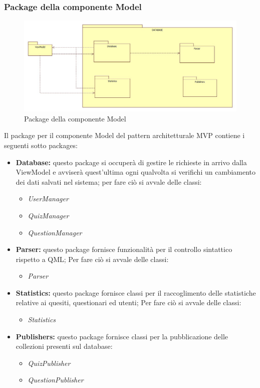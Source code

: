 \subsubsection{Package della componente Model}
	\begin{figure}[h!]
	\begin{center}
		\includegraphics[scale=0.45]{../images/ModelPackage.jpg}
		\caption{Package della componente Model}
	\end{center}
	\end{figure}
	Il package per il componente Model del pattern architetturale MVP contiene i seguenti sotto packages:
	\begin{itemize}
		\item\textbf{Database:} questo package si occuperà di gestire le richieste in arrivo dalla ViewModel e avviserà quest'ultima ogni qualvolta si verifichi un cambiamento dei dati salvati nel sistema; per fare ciò si avvale delle classi:
			\begin{itemize}
				\item\textit{UserManager}
				\item\textit{QuizManager}
				\item\textit{QuestionManager}
			\end{itemize}
		\item\textbf{Parser:} questo package fornisce funzionalità per il controllo sintattico rispetto a QML; Per fare ciò si avvale delle classi:
			\begin{itemize}
				\item\textit{Parser}
			\end{itemize}
		\item\textbf{Statistics:} questo package fornisce classi per il raccoglimento delle statistiche relative ai quesiti, questionari ed utenti; Per fare ciò si avvale delle classi:
			\begin{itemize}
				\item\textit{Statistics}
			\end{itemize}
			\item\textbf{Publishers:} questo package fornisce classi per la pubblicazione delle collezioni presenti sul database:
			\begin{itemize}
				\item\textit{QuizPublisher}
				\item\textit{QuestionPublisher}
			\end{itemize}
		\end{itemize}